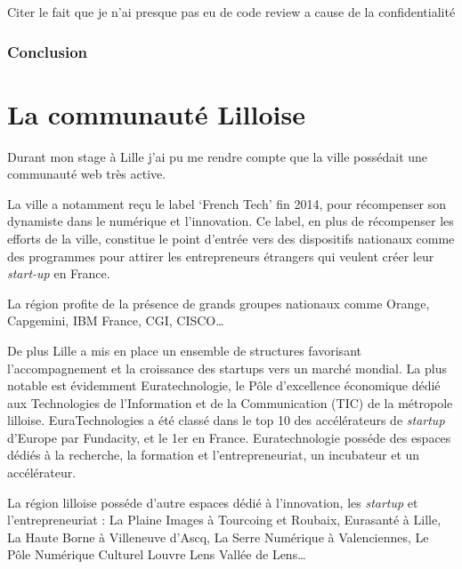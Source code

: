 Citer le fait que je n'ai presque pas eu de code review a cause de la
confidentialité

\subsubsection{Conclusion}\label{conclusion-1}

\newpage

\newpage

\section{La communauté Lilloise}\label{la-communautuxe9-lilloise}

Durant mon stage à Lille j'ai pu me rendre compte que la ville possédait
une communauté web très active.

\bigskip

La ville a notamment reçu le label `French Tech' fin 2014, pour
récompenser son dynamiste dans le numérique et l'innovation. Ce label,
en plus de récompenser les efforts de la ville, constitue le point
d'entrée vers des dispositifs nationaux comme des programmes pour
attirer les entrepreneurs étrangers qui veulent créer leur
\emph{start-up} en France.

\bigskip

La région profite de la présence de grands groupes nationaux comme
Orange, Capgemini, IBM France, CGI, CISCO\ldots{}

\bigskip

De plus Lille a mis en place un ensemble de structures favorisant
l'accompagnement et la croissance des startups vers un marché mondial.
La plus notable est évidemment Euratechnologie, le Pôle d'excellence
économique dédié aux Technologies de l'Information et de la
Communication (TIC) de la métropole lilloise. EuraTechnologies a été
classé dans le top 10 des accélérateurs de \emph{startup} d'Europe par
Fundacity, et le 1er en France. Euratechnologie posséde des espaces
dédiés à la recherche, la formation et l'entrepreneuriat, un incubateur
et un accélérateur.

\bigskip

La région lilloise posséde d'autre espaces dédié à l'innovation, les
\emph{startup} et l'entrepreneuriat : La Plaine Images à Tourcoing et
Roubaix, Eurasanté à Lille, La Haute Borne à Villeneuve d'Ascq, La Serre
Numérique à Valenciennes, Le Pôle Numérique Culturel Louvre Lens Vallée
de Lens\ldots{}

\bigskip


